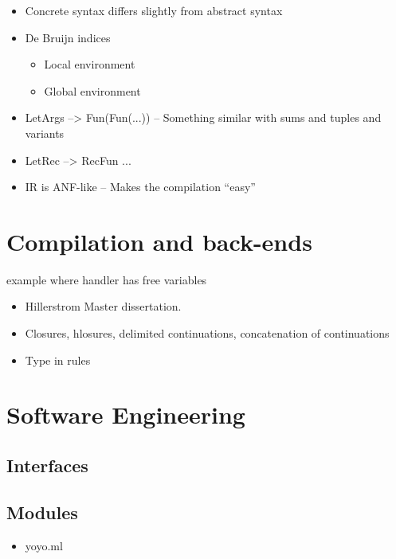 \documentclass[class=article, crop=false]{standalone}
\begin{document}
\begin{itemize}
\item Concrete syntax differs slightly from abstract syntax
\item De Bruijn indices
\begin{itemize}
    \item Local environment
    \item Global environment
\end{itemize}
\item LetArgs --> Fun(Fun(...)) -- Something similar with sums and tuples and variants
\item LetRec --> RecFun ...
\item IR is ANF-like -- Makes the compilation ``easy''
\end{itemize}

\section{Compilation and back-ends}

example where handler has free variables

\begin{itemize}
    \item Hillerstrom Master dissertation.
    \item Closures, hlosures, delimited continuations, concatenation of continuations
\end{itemize}

\begin{itemize}
    \item Type in rules
\end{itemize}





\section{Software Engineering}

\subsection{Interfaces}
\subsection{Modules}
\begin{itemize}
    \item yoyo.ml
\end{itemize}
\end{document}
